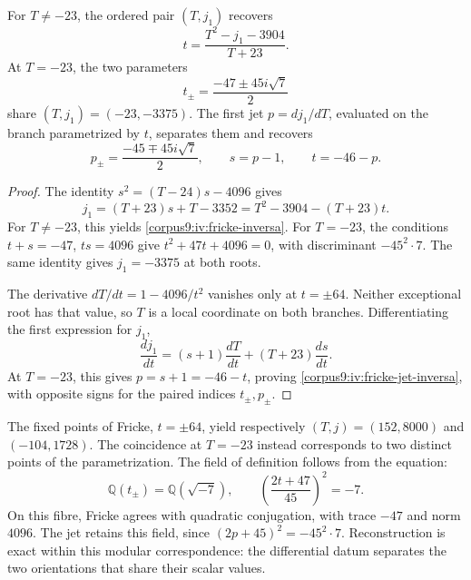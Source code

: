 \begin{proposition}
\label{corpus9:iv:fricke-jet}
For \(T\ne-23\), the ordered pair \((T,j_1)\) recovers
\begin{equation}
 t=\frac{T^2-j_1-3904}{T+23}.
 \label{corpus9:iv:fricke-inversa}
\end{equation}
At \(T=-23\), the two parameters
\[
 t_\pm=\frac{-47\pm45i\sqrt7}{2}
\]
share \((T,j_1)=(-23,-3375)\). The first jet
\(p=dj_1/dT\), evaluated on the branch parametrized by \(t\),
separates them and recovers
\begin{equation}
 p_\pm=\frac{-45\mp45i\sqrt7}{2},\qquad
 s=p-1,\qquad t=-46-p.
 \label{corpus9:iv:fricke-jet-inversa}
\end{equation}
\end{proposition}
\begin{proof}
The identity \(s^2=(T-24)s-4096\) gives
\[
 j_1=(T+23)s+T-3352
     =T^2-3904-(T+23)t.
\]
For \(T\ne-23\), this yields
\eqref{corpus9:iv:fricke-inversa}. For \(T=-23\),
the conditions \(t+s=-47\), \(ts=4096\) give
\(t^2+47t+4096=0\), with discriminant \(-45^2\cdot7\).
The same identity gives \(j_1=-3375\) at both roots.

The derivative \(dT/dt=1-4096/t^2\) vanishes only at
\(t=\pm64\). Neither exceptional root has that value,
so \(T\) is a local coordinate on both branches.
Differentiating the first expression for \(j_1\),
\[
 \frac{dj_1}{dt}
  =(s+1)\frac{dT}{dt}+(T+23)\frac{ds}{dt}.
\]
At \(T=-23\), this gives \(p=s+1=-46-t\), proving
\eqref{corpus9:iv:fricke-jet-inversa}, with opposite signs
for the paired indices \(t_\pm,p_\pm\).
\end{proof}

The fixed points of Fricke, \(t=\pm64\), yield respectively
\((T,j)=(152,8000)\) and \((-104,1728)\). The coincidence at
\(T=-23\) instead corresponds to two distinct points of the
parametrization. The field of definition follows from the equation:
\[
 \mathbb Q(t_\pm)=\mathbb Q(\sqrt{-7}),\qquad
 \left(\frac{2t+47}{45}\right)^2=-7.
\]
On this fibre, Fricke agrees with quadratic conjugation,
with trace \(-47\) and norm \(4096\). The jet retains this field,
since \((2p+45)^2=-45^2\cdot7\). Reconstruction is exact
within this modular correspondence: the differential datum separates
the two orientations that share their scalar values.
